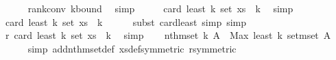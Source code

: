 \begin{isabellebody}
\ \ \ \ \isamarkupfalse%
\ rank{\isacharunderscore}{\kern0pt}conv\ k{\isacharunderscore}{\kern0pt}bound\ \isamarkupfalse%
\ simp\isanewline
\ \ \isamarkupfalse%
\ \isamarkupfalse%
\ {\isachardoublequoteopen}card\ {\isacharparenleft}{\kern0pt}least\ {\isacharparenleft}{\kern0pt}k{\isacharplus}{\kern0pt}{}{\isacharparenright}{\kern0pt}\ {\isacharparenleft}{\kern0pt}set\ xs{\isacharparenright}{\kern0pt}{\isacharparenright}{\kern0pt}\ {\isasymge}\ k{\isacharplus}{\kern0pt}{}{\isachardoublequoteclose}\ \isamarkupfalse%
\ simp\isanewline
\ \ \isamarkupfalse%
\ \isamarkupfalse%
\ {\isachardoublequoteopen}card\ {\isacharparenleft}{\kern0pt}least\ {\isacharparenleft}{\kern0pt}k{\isacharplus}{\kern0pt}{}{\isacharparenright}{\kern0pt}\ {\isacharparenleft}{\kern0pt}set\ xs{\isacharparenright}{\kern0pt}{\isacharparenright}{\kern0pt}\ {\isasymle}\ k{\isacharplus}{\kern0pt}{}{\isachardoublequoteclose}\isanewline
\ \ \ \ \isamarkupfalse%
\ {\isacharparenleft}{\kern0pt}subst\ card{\isacharunderscore}{\kern0pt}least{\isacharcomma}{\kern0pt}\ simp{\isacharcomma}{\kern0pt}\ simp{\isacharparenright}{\kern0pt}\isanewline
\ \ \isamarkupfalse%
\ \isamarkupfalse%
\ r{\isacharunderscore}{\kern0pt}{}{\isacharcolon}{\kern0pt}\ {\isachardoublequoteopen}card\ {\isacharparenleft}{\kern0pt}least\ {\isacharparenleft}{\kern0pt}k{\isacharplus}{\kern0pt}{}{\isacharparenright}{\kern0pt}\ {\isacharparenleft}{\kern0pt}set\ xs{\isacharparenright}{\kern0pt}{\isacharparenright}{\kern0pt}\ {\isacharequal}{\kern0pt}\ k{\isacharplus}{\kern0pt}{}{\isachardoublequoteclose}\ \isamarkupfalse%
\ simp\isanewline
\isanewline
\ \ \isamarkupfalse%
\ {\isachardoublequoteopen}nth{\isacharunderscore}{\kern0pt}mset\ k\ A\ {\isacharequal}{\kern0pt}\ Max\ {\isacharparenleft}{\kern0pt}least\ {\isacharparenleft}{\kern0pt}k{\isacharplus}{\kern0pt}{}{\isacharparenright}{\kern0pt}\ {\isacharparenleft}{\kern0pt}set{\isacharunderscore}{\kern0pt}mset\ A{\isacharparenright}{\kern0pt}{\isacharparenright}{\kern0pt}{\isachardoublequoteclose}\ \isanewline
\ \ \ \ \isamarkupfalse%
\ {\isacharparenleft}{\kern0pt}simp\ add{\isacharcolon}{\kern0pt}nth{\isacharunderscore}{\kern0pt}mset{\isacharunderscore}{\kern0pt}def\ xs{\isacharunderscore}{\kern0pt}def{\isacharbrackleft}{\kern0pt}symmetric{\isacharbrackright}{\kern0pt}\ r{\isacharunderscore}{\kern0pt}{}{\isacharbrackleft}{\kern0pt}symmetric{\isacharbrackright}{\kern0pt}{\isacharparenright}{\kern0pt}\isanewline

\end{isabellebody}
